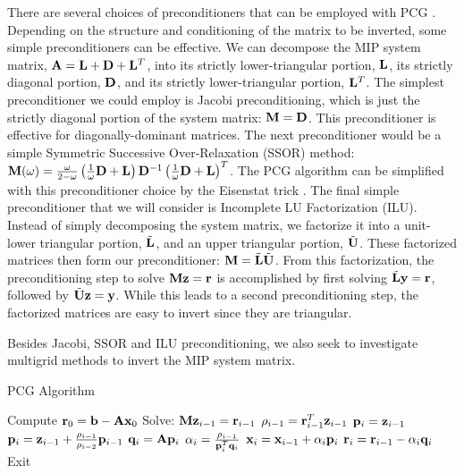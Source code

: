 There are several choices of preconditioners that can be employed with PCG \cite{saad2003iterative}. Depending on the structure and conditioning of the matrix to be inverted, some simple preconditioners can be effective. We can decompose the MIP system matrix, ${\bf A} = {\bf L} + {\bf D} + {\bf L}^T$, into its strictly lower-triangular portion, ${\bf L}$, its strictly diagonal portion, ${\bf D}$, and its strictly lower-triangular portion, ${\bf L}^T$. The simplest preconditioner we could employ is Jacobi preconditioning, which is just the strictly diagonal portion of the system matrix: ${\bf M} = {\bf D}$. This preconditioner is effective for diagonally-dominant matrices. The next preconditioner would be a simple Symmetric Successive Over-Relaxation (SSOR) method: ${\bf M} (\omega) = \frac{\omega}{2-\omega} \left( \frac{1}{\omega}{\bf D} + {\bf L}  \right)  {\bf D}^{-1}  \left( \frac{1}{\omega}{\bf D} + {\bf L}  \right)^T$. The PCG algorithm can be simplified with this preconditioner choice by the Eisenstat trick \cite{eisenstat1981efficient}. The final simple preconditioner that we will consider is Incomplete LU Factorization (ILU). Instead of simply decomposing the system matrix, we factorize it into a unit-lower triangular portion, $\tilde{{\bf L}}$, and an upper triangular portion, $\tilde{{\bf U}}$. These factorized matrices then form our preconditioner: ${\bf M} =\tilde{{\bf L}}\tilde{{\bf U}}$. From this factorization, the preconditioning step to solve ${\bf M} {\bf z}= {\bf r}$ is accomplished by first solving $\tilde{{\bf L}} {\bf y}= {\bf r} $, followed by $\tilde{{\bf U}} {\bf z}= {\bf y} $. While this leads to a second preconditioning step, the factorized matrices are easy to invert since they are triangular.

Besides Jacobi, SSOR and ILU preconditioning, we also seek to investigate multigrid methods to invert the MIP system matrix. 

\begin{algorithm}
\caption{PCG Algorithm}
\label{alg::DSA_PCG}
\begin{algorithmic}[1]
\State Compute ${\bf r}_0 = {\bf b} - {\bf A} {\bf x}_0$
\State Solve: ${\bf M} {\bf z}_{i-1} = {\bf r}_{i-1}$
\State $\rho_{i-1} = {\bf r}_{i-1}^T {\bf z}_{i-1}$
	\State ${\bf p}_i  = {\bf z}_{i-1} $
\Else
	\State ${\bf p}_i = {\bf z}_{i-1} + \frac{\rho_{i-1}}{\rho_{i-2}}{\bf p}_{i-1}  $
\EndIf
\State ${\bf q}_i = {\bf A} {\bf p}_i$
\State $\alpha_i = \frac{\rho_{i-1}}{{\bf p}_i^T{\bf q}_i} $
\State ${\bf x}_i = {\bf x}_{i-1} + \alpha_i  {\bf p}_i$
\State ${\bf r}_i = {\bf r}_{i-1} - \alpha_i  {\bf q}_i$
	\State Exit
\EndIf
\EndFor
\end{algorithmic}
\end{algorithm}

